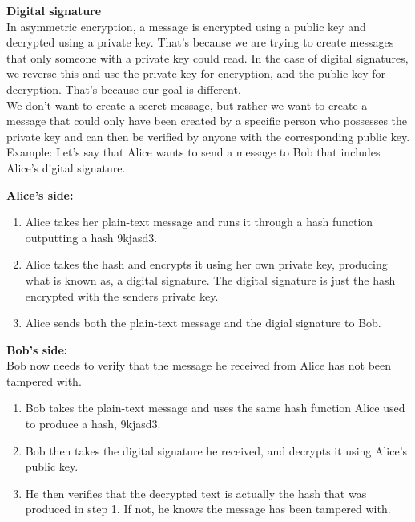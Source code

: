 \textbf{Digital signature} \\
In asymmetric encryption, a message is encrypted using a public key and decrypted using a private key. That's because we are trying to create messages that only someone with a private key could read. In the case of digital signatures, we reverse this and use the private key for encryption, and the public key for decryption. That's because our goal is different. \\
We don't want to create a secret message, but rather we want to create a message that could only have been created by a specific person who possesses the private key and can then be verified by anyone with the corresponding public key. \\

Example: Let's say that Alice wants to send a message to Bob that includes Alice's digital signature.

    \textbf{\small Alice's side:}
    \begin{enumerate}
    \item Alice takes her plain-text message and runs it through a hash function outputting a hash 9kjasd3. 
    \item Alice takes the hash and encrypts it using her own private key, producing what is known as, a digital signature. The digital signature is just the hash encrypted with the senders private key. 
    \item Alice sends both the plain-text message and the digial signature to Bob. 
    \end{enumerate}
    
    \textbf{\small Bob's side:} \\
    Bob now needs to verify that the message he received from Alice has not been tampered with. 
    \begin{enumerate}
    \item Bob takes the plain-text message and uses the same hash function Alice used to produce a hash, 9kjasd3.
    
    \item Bob then takes the digital signature he received, and decrypts it using Alice's public key. 
    
    \item He then verifies that the decrypted text is actually the hash that was produced in step 1. If not, he knows the message has been tampered with. 
    \end{enumerate}



